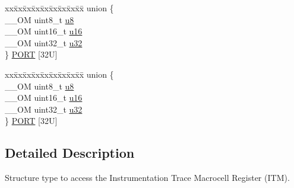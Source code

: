 \begin{DoxyCompactItemize}
\begin{tabbing}
\end{tabbing}\item 
\begin{tabbing}
xx\=xx\=xx\=xx\=xx\=xx\=xx\=xx\=xx\=\kill
union \{\\
\>\_\_OM uint8\_t \hyperlink{struct_i_t_m___type_ae773bf9f9dac64e6c28b14aa39f74275}{u8}\\
\>\_\_OM uint16\_t \hyperlink{struct_i_t_m___type_a962a970dfd286cad7f8a8577e87d4ad3}{u16}\\
\>\_\_OM uint32\_t \hyperlink{struct_i_t_m___type_a5834885903a557674f078f3b71fa8bc8}{u32}\\
\} \hyperlink{struct_i_t_m___type_a4fb98d5d5771d3b2f37c9a483b5793cc}{PORT} \mbox{[}32U\mbox{]}\\

\end{tabbing}\item 
\begin{tabbing}
xx\=xx\=xx\=xx\=xx\=xx\=xx\=xx\=xx\=\kill
union \{\\
\>\_\_OM uint8\_t \hyperlink{struct_i_t_m___type_ae773bf9f9dac64e6c28b14aa39f74275}{u8}\\
\>\_\_OM uint16\_t \hyperlink{struct_i_t_m___type_a962a970dfd286cad7f8a8577e87d4ad3}{u16}\\
\>\_\_OM uint32\_t \hyperlink{struct_i_t_m___type_a5834885903a557674f078f3b71fa8bc8}{u32}\\
\} \hyperlink{struct_i_t_m___type_a1f61b04815065bea9ae1d2c4435fcd94}{PORT} \mbox{[}32U\mbox{]}\\

\end{tabbing}\end{DoxyCompactItemize}


\subsection{Detailed Description}
Structure type to access the Instrumentation Trace Macrocell Register (I\-T\-M). 

